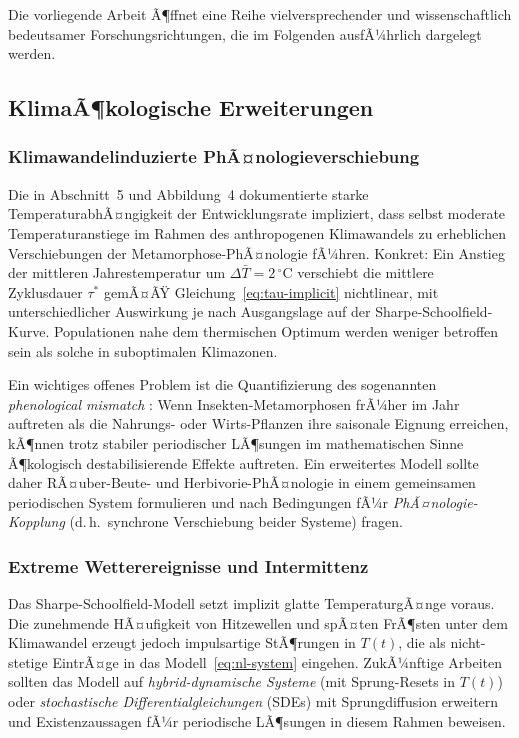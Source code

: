 ﻿\documentclass[12pt, a4paper]{article}
\theoremstyle{definition}
\begin{document}
Die vorliegende Arbeit Ã¶ffnet eine Reihe vielversprechender und wissenschaftlich
bedeutsamer Forschungsrichtungen, die im Folgenden ausfÃ¼hrlich dargelegt werden.

\subsection{KlimaÃ¶kologische Erweiterungen}

\subsubsection{Klimawandelinduzierte PhÃ¤nologieverschiebung}
Die in Abschnitt~5 und Abbildung~4 dokumentierte starke TemperaturabhÃ¤ngigkeit
der Entwicklungsrate impliziert, dass selbst moderate Temperaturanstiege im Rahmen
des anthropogenen Klimawandels zu erheblichen Verschiebungen der Metamorphose-PhÃ¤nologie
fÃ¼hren. Konkret: Ein Anstieg der mittleren Jahrestemperatur um $\Delta\bar{T} = 2\,^\circ$C
verschiebt die mittlere Zyklusdauer $\tau^*$ gemÃ¤ÃŸ Gleichung~\eqref{eq:tau-implicit}
nichtlinear, mit unterschiedlicher Auswirkung je nach Ausgangslage auf der
Sharpe-Schoolfield-Kurve. Populationen nahe dem thermischen Optimum werden weniger
betroffen sein als solche in suboptimalen Klimazonen.

Ein wichtiges offenes Problem ist die Quantifizierung des sogenannten
\emph{phenological mismatch} \cite{Visser2005}: Wenn Insekten-Metamorphosen frÃ¼her
im Jahr auftreten als die Nahrungs- oder Wirts-Pflanzen ihre saisonale Eignung
erreichen, kÃ¶nnen trotz stabiler periodischer LÃ¶sungen im mathematischen Sinne
Ã¶kologisch destabilisierende Effekte auftreten. Ein erweitertes Modell sollte
daher RÃ¤uber-Beute- und Herbivorie-PhÃ¤nologie in einem gemeinsamen periodischen
System formulieren und nach Bedingungen fÃ¼r \emph{PhÃ¤nologie-Kopplung} (d.\,h.\
synchrone Verschiebung beider Systeme) fragen.

\subsubsection{Extreme Wetterereignisse und Intermittenz}
Das Sharpe-Schoolfield-Modell setzt implizit glatte TemperaturgÃ¤nge voraus.
Die zunehmende HÃ¤ufigkeit von Hitzewellen und spÃ¤ten FrÃ¶sten unter dem Klimawandel
erzeugt jedoch impulsartige StÃ¶rungen in $T(t)$, die als nicht-stetige EintrÃ¤ge in
das Modell~\eqref{eq:nl-system} eingehen. ZukÃ¼nftige Arbeiten sollten das Modell
auf \emph{hybrid-dynamische Systeme} (mit Sprung-Resets in $T(t)$) oder
\emph{stochastische Differentialgleichungen} (SDEs) mit Sprungdiffusion erweitern
und Existenzaussagen fÃ¼r periodische LÃ¶sungen in diesem Rahmen beweisen.
\end{document}
